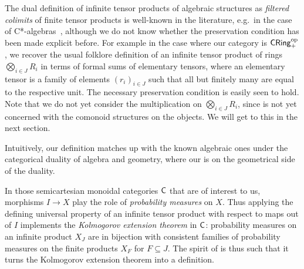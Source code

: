 \documentclass[11pt]{article}
\begin{document}
\begin{example}
	\label{infprods_cring}
	The dual definition of infinite tensor products of algebraic structures as \emph{filtered colimits} of finite tensor products is well-known in the literature, e.g.~in the case of C*-algebras~\cite[p.~315]{blackadar}, although we do not know whether the preservation condition has been made explicit before. For example in the case where our category is $\operatorname{\mathsf{CRing}}_+^{\mathrm{op}}$, we recover the usual folklore definition of an infinite tensor product of rings $\bigotimes_{i \in J} R_i$ in terms of formal sums of elementary tensors, where an elementary tensor is a family of elements $(r_i)_{i \in J}$ such that all but finitely many are equal to the respective unit. The necessary preservation condition is easily seen to hold. Note that we do not yet consider the multiplication on $\bigotimes_{i \in J} R_i$, since  is not yet concerned with the comonoid structures on the objects. We will get to this in the next section.
	
	Intuitively, our definition matches up with the known algebraic ones under the categorical duality of algebra and geometry, where our  is on the geometrical side of the duality.
\end{example}

\begin{remark}
	In those semicartesian monoidal categories $\mathsf{C}$ that are of interest to us, morphisms $I \to X$ play the role of \emph{probability measures} on $X$. Thus applying the defining universal property of an infinite tensor product with respect to maps out of $I$ implements the \emph{Kolmogorov extension theorem} in $\mathsf{C}$: probability measures on an infinite product $X_J$ are in bijection with consistent families of probability measures on the finite products $X_F$ for $F \subseteq J$. The spirit of  is thus such that it turns the Kolmogorov extension theorem into a definition.
\end{remark}
\end{document}
